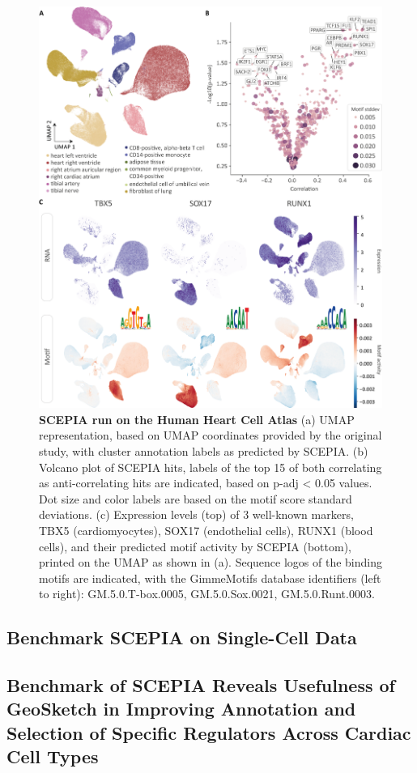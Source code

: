 \begin{figure}
    \centering
    \includegraphics[width=0.75\linewidth]{ch.scepia/imgs/SCEPIA_allCells_Fig1_v9.png}
    \caption{\textbf{SCEPIA run on the Human Heart Cell Atlas} (a) UMAP representation, based on UMAP coordinates provided by the original study\cite{Kanemaru2023}, with cluster annotation labels as predicted by SCEPIA. (b) Volcano plot of SCEPIA hits, labels of the top 15 of both correlating as anti-correlating hits are indicated, based on p-adj < 0.05 values. Dot size and color labels are based on the motif score standard deviations.  (c) Expression levels (top) of 3 well-known markers, TBX5 (cardiomyocytes), SOX17 (endothelial cells), RUNX1 (blood cells), and their predicted motif activity by SCEPIA (bottom), printed on the UMAP as shown in (a). Sequence logos of the binding motifs are indicated, with the GimmeMotifs database identifiers (left to right): GM.5.0.T-box.0005, GM.5.0.Sox.0021, GM.5.0.Runt.0003. }
    \label{fig:scepia_hhca1}
\end{figure}


\subsection{Benchmark SCEPIA on Single-Cell Data }
\subsection{Benchmark of SCEPIA Reveals Usefulness of GeoSketch in Improving Annotation and Selection of Specific Regulators Across Cardiac Cell Types}

